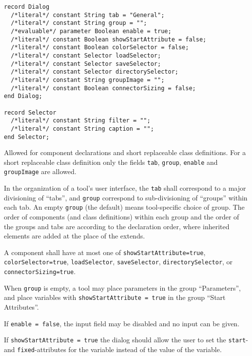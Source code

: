 \begin{annotationdefinition}[Dialog]
\begin{synopsis}\begin{lstlisting}
record Dialog
  /*literal*/ constant String tab = "General";
  /*literal*/ constant String group = "";
  /*evaluable*/ parameter Boolean enable = true;
  /*literal*/ constant Boolean showStartAttribute = false;
  /*literal*/ constant Boolean colorSelector = false;
  /*literal*/ constant Selector loadSelector;
  /*literal*/ constant Selector saveSelector;
  /*literal*/ constant Selector directorySelector;
  /*literal*/ constant String groupImage = "";
  /*literal*/ constant Boolean connectorSizing = false;
end Dialog;

record Selector
  /*literal*/ constant String filter = "";
  /*literal*/ constant String caption = "";
end Selector;
\end{lstlisting}\end{synopsis}
\begin{semantics}
Allowed for component declarations and short replaceable class definitions.
For a short replaceable class definition only the fields \lstinline!tab!, \lstinline!group!, \lstinline!enable! and \lstinline!groupImage! are allowed.

In the organization of a tool's user interface, the \lstinline!tab! shall correspond to a major divisioning of ``tabs'', and \lstinline!group! correspond to sub-divisioning of ``groups'' within each tab.
An empty \lstinline!group! (the default) means tool-specific choice of group.
The order of components (and class definitions) within each group and the order of the groups and tabs are according to the declaration order, where inherited elements are added at the place of the extends.

A component shall have at most one of \lstinline!showStartAttribute=true!, \lstinline!colorSelector=true!, \lstinline!loadSelector!, \lstinline!saveSelector!, \lstinline!directorySelector!, or \lstinline!connectorSizing=true!.

\begin{example}
When \lstinline!group! is empty, a tool may place parameters in the group ``Parameters'', and place variables with \lstinline!showStartAttribute = true! in the group ``Start Attributes''.
\end{example}

If \lstinline!enable = false!, the input field may be disabled and no input can be given.

If \lstinline!showStartAttribute = true! the dialog should allow the user to set the \lstinline!start!- and \lstinline!fixed!-attributes for the variable instead of the value of the variable.


\end{semantics}
\end{annotationdefinition}
